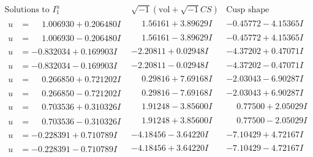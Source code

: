 \documentclass[1p]{elsarticle_modified}
\theoremstyle{definition}
\newcommand{\I}{\sqrt{-1}}
\begin{document}
$$\begin{array}{c|c|c}  
\text{Solutions to }I^u_{1}& \I (\text{vol} + \sqrt{-1}CS) & \text{Cusp shape}\\
 \hline 
\begin{aligned}
u &= \phantom{-}1.006930 + 0.206480 I\end{aligned}
 & \phantom{-}1.56161 + 3.89629 I & -0.45772 - 4.15365 I \\ \hline\begin{aligned}
u &= \phantom{-}1.006930 - 0.206480 I\end{aligned}
 & \phantom{-}1.56161 - 3.89629 I & -0.45772 + 4.15365 I \\ \hline\begin{aligned}
u &= -0.832034 + 0.169903 I\end{aligned}
 & -2.20811 + 0.02948 I & -4.37202 + 0.47071 I \\ \hline\begin{aligned}
u &= -0.832034 - 0.169903 I\end{aligned}
 & -2.20811 - 0.02948 I & -4.37202 - 0.47071 I \\ \hline\begin{aligned}
u &= \phantom{-}0.266850 + 0.721202 I\end{aligned}
 & \phantom{-}0.29816 + 7.69168 I & -2.03043 - 6.90287 I \\ \hline\begin{aligned}
u &= \phantom{-}0.266850 - 0.721202 I\end{aligned}
 & \phantom{-}0.29816 - 7.69168 I & -2.03043 + 6.90287 I \\ \hline\begin{aligned}
u &= \phantom{-}0.703536 + 0.310326 I\end{aligned}
 & \phantom{-}1.91248 - 3.85600 I & \phantom{-}0.77500 + 2.05029 I \\ \hline\begin{aligned}
u &= \phantom{-}0.703536 - 0.310326 I\end{aligned}
 & \phantom{-}1.91248 + 3.85600 I & \phantom{-}0.77500 - 2.05029 I \\ \hline\begin{aligned}
u &= -0.228391 + 0.710789 I\end{aligned}
 & -4.18456 - 3.64220 I & -7.10429 + 4.72167 I \\ \hline\begin{aligned}
u &= -0.228391 - 0.710789 I\end{aligned}
 & -4.18456 + 3.64220 I & -7.10429 - 4.72167 I \\ \hline\begin{aligned}

\end{aligned}
\end{array}$$
\end{document}
